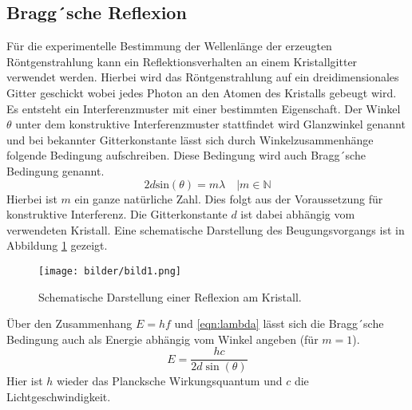 \subsection{Bragg´sche Reflexion}
Für die experimentelle Bestimmung der Wellenlänge der erzeugten Röntgenstrahlung kann ein Reflektionsverhalten an einem Kristallgitter verwendet werden.
Hierbei wird das Röntgenstrahlung auf ein dreidimensionales Gitter geschickt wobei jedes Photon an den Atomen des Kristalls gebeugt wird. Es entsteht ein Interferenzmuster mit einer bestimmten Eigenschaft.
Der Winkel $\theta$ unter dem konstruktive Interferenzmuster stattfindet wird Glanzwinkel genannt und bei bekannter Gitterkonstante lässt sich durch Winkelzusammenhänge folgende Bedingung aufschreiben.
Diese Bedingung wird auch Bragg´sche Bedingung genannt.
\begin{equation}
\label{eqn:lambda}
2 d \text{sin}(\theta) =  m \lambda \quad | m \in \mathbb{N}
\end{equation}
Hierbei ist $m$ ein ganze natürliche Zahl. Dies folgt aus der Voraussetzung für konstruktive Interferenz. Die Gitterkonstante $d$ ist dabei abhängig vom verwendeten Kristall.
Eine schematische Darstellung des Beugungsvorgangs ist in Abbildung \ref{fig:bild1} gezeigt.
\\
\begin{figure}[h]
  \centering
  \texttt{[image: bilder/bild1.png]}
  \caption{Schematische Darstellung einer Reflexion am Kristall.}
  \label{fig:bild1}
\end{figure}
Über den Zusammenhang $E = h f$  und \ref{eqn:lambda} lässt sich die Bragg´sche Bedingung auch als Energie abhängig vom Winkel angeben (für $m=1$).
\begin{equation}
    \label{eqn:braggEnergy}
    E = \frac{h c}{2 d \sin (\theta )}
\end{equation}
Hier ist $h$ wieder das Plancksche Wirkungsquantum und $c$ die Lichtgeschwindigkeit.
